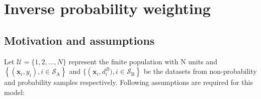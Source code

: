 \documentclass[
  letterpaper,
  DIV=11,
  numbers=noendperiod]{scrreprt}
\author{}
\date{}
\begin{document}
\ifdefined\Shaded\renewenvironment{Shaded}{\begin{tcolorbox}[interior hidden, frame hidden, sharp corners, enhanced, boxrule=0pt, borderline west={3pt}{0pt}{shadecolor}, breakable]}{\end{tcolorbox}}\fi

\hypertarget{inverse-probability-weighting}{%
\chapter{Inverse probability
weighting}\label{inverse-probability-weighting}}

\newcommand{\bSigma}{\boldsymbol{\Sigma}}
\newcommand{\bOmega}{\boldsymbol{\Omega}}
\newcommand{\bTheta}{\boldsymbol{\Theta}}
\newcommand{\bPi}{\boldsymbol{\Pi}}
\newcommand{\bbeta}{\boldsymbol{\beta}}
\newcommand{\balpha}{\boldsymbol{\alpha}}
\newcommand{\brho}{\boldsymbol{\rho}}
\newcommand{\beps}{\boldsymbol{\epsilon}}
\newcommand{\blambda}{\boldsymbol{\lambda}}
\newcommand{\bgamma}{\boldsymbol{\gamma}}
\newcommand{\btheta}{\boldsymbol{\theta}}
\newcommand{\bmu}{\boldsymbol{\mu}}
\newcommand{\bpi}{\boldsymbol{\pi}}
\newcommand{\bphi}{\boldsymbol{\phi}}
\newcommand{\bPhi}{\boldsymbol{\Phi}}
\newcommand{\boldeta}{\boldsymbol{\eta}}
\newcommand{\bx}{\boldsymbol{x}}
\newcommand{\bD}{\boldsymbol{D}}
\newcommand{\bV}{\boldsymbol{V}}
\newcommand{\bv}{\boldsymbol{v}}
\newcommand{\bY}{\boldsymbol{Y}}
\newcommand{\bA}{\boldsymbol{A}}
\newcommand{\bB}{\boldsymbol{B}}
\newcommand{\bR}{\boldsymbol{R}}
\newcommand{\bM}{\boldsymbol{M}}
\newcommand{\bI}{\boldsymbol{I}}
\newcommand{\bC}{\boldsymbol{C}}
\newcommand{\bW}{\boldsymbol{W}}
\newcommand{\bw}{\boldsymbol{w}}
\newcommand{\bd}{\boldsymbol{d}}
\newcommand{\bT}{\boldsymbol{T}}
\newcommand{\bt}{\boldsymbol{t}}
\newcommand{\bZ}{\boldsymbol{Z}}
\newcommand{\bX}{\boldsymbol{X}}
\newcommand{\bz}{\boldsymbol{z}}
\newcommand{\by}{\boldsymbol{y}}
\newcommand{\br}{\boldsymbol{r}}
\newcommand{\bp}{\boldsymbol{p}}
\newcommand{\bb}{\boldsymbol{b}}
\newcommand{\bZero}{\boldsymbol{0}}
\newcommand{\bOne}{\boldsymbol{1}}

\hypertarget{motivation-and-assumptions}{%
\section{Motivation and assumptions}\label{motivation-and-assumptions}}

Let \(\mathcal{U}=\{1,2, \ldots, N\}\) represent the finite population
with N units and
\(\left\{\left(\bx_i, y_i\right), i \in \mathcal{S}_{\mathrm{A}}\right\}\)
and \(\{\left(\bx_i, d_i^B), i \in \mathcal{S}_{\mathrm{B}}\right\}\) be
the datasets from non-probability and probability samples respectively.
Following assumptions are required for this model:
\end{document}
